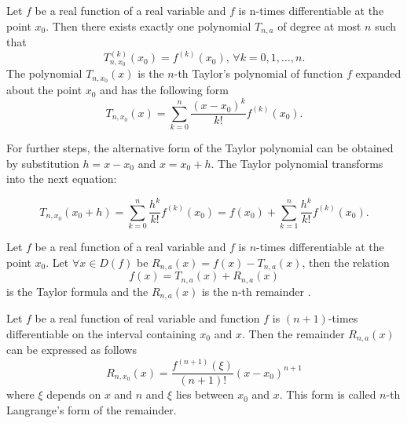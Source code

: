 \begin{definition}
 Let \(f\) be a real function of a real variable and \(f\) is n-times differentiable at the point \(x_0\).
 Then there exists exactly one polynomial \(T_{n, a}\) of degree at most \(n\) such that
 \begin{equation}
 T_{n, x_0}^{(k)}(x_0) = f^{(k)}(x_0) \text{, } \forall k = 0, 1, \dots, n.
 \end{equation}
 The polynomial \(T_{n, x_0}(x)\) is the \(n\)-th Taylor's polynomial of function \(f\) expanded about the point \(x_0\) and has the following form
 \begin{equation}
 T_{n, x_0}(x) = \sum_{k=0}^{n} \frac{(x - x_0)^k}{k!} f^{(k)}(x_0).
 \end{equation}
\end{definition}

For further steps, the alternative form of the Taylor polynomial can be obtained by substitution \(h = x - x_0\) and \(x = x_0 + h\).
The Taylor polynomial transforms into the next equation:

\begin{equation} \label{TailorFN}
 T_{n, x_0}(x_0 + h) = \sum_{k=0}^n \frac{h^k}{k!} f^{(k)}(x_0) = f(x_0) + \sum_{k=1}^{n} \frac{h^k}{k!} f^{(k)}(x_0).
\end{equation}

\begin{definition}
 Let \(f\) be a real function of a real variable and \(f\) is \(n\)-times differentiable at the point \(x_0\).
 Let \( \forall x \in D(f) \) be \(R_{n, a}(x) = f(x) - T_{n, a}(x)\), then the relation
 \begin{equation}
 f(x) = T_{n, a}(x) + R_{n, a}(x)
 \end{equation}
 is the Taylor formula and the \(R_{n,a}(x)\) is the n-th remainder \cite{TaylorFormula}.
\end{definition}

\begin{definition}
 Let \(f\) be a real function of real variable and function \(f\) is \((n+1)\)-times differentiable on the interval containing \(x_0\) and \(x\).
 Then the remainder \(R_{n,a}(x)\) can be expressed as follows
 \begin{equation}
 R_{n,x_0}(x) = \frac{ f^{(n+1)}(\xi) } { (n + 1)! } (x-x_0)^{n + 1}
 \end{equation}
 where \(\xi\) depends on \(x\) and \(n\) and \(\xi\) lies between \(x_0\) and \(x\).
 This form is called \(n\)-th Langrange's form of the remainder.
\end{definition}

